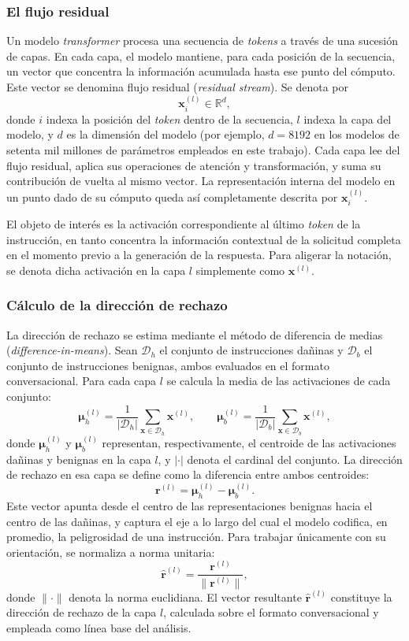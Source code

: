 \documentclass[12pt,a4paper]{article}
\begin{document}
\subsubsection*{El flujo residual}

Un modelo \textit{transformer} procesa una secuencia de \textit{tokens} a través de una sucesión de capas. En cada capa, el modelo mantiene, para cada posición de la secuencia, un vector que concentra la información acumulada hasta ese punto del cómputo. Este vector se denomina flujo residual (\textit{residual stream}). Se denota por
\[
\bm{x}_i^{(l)} \in \mathbb{R}^{d},
\]
donde $i$ indexa la posición del \textit{token} dentro de la secuencia, $l$ indexa la capa del modelo, y $d$ es la dimensión del modelo (por ejemplo, $d = 8192$ en los modelos de setenta mil millones de parámetros empleados en este trabajo). Cada capa lee del flujo residual, aplica sus operaciones de atención y transformación, y suma su contribución de vuelta al mismo vector. La representación interna del modelo en un punto dado de su cómputo queda así completamente descrita por $\bm{x}_i^{(l)}$.

El objeto de interés es la activación correspondiente al último \textit{token} de la instrucción, en tanto concentra la información contextual de la solicitud completa en el momento previo a la generación de la respuesta. Para aligerar la notación, se denota dicha activación en la capa $l$ simplemente como $\bm{x}^{(l)}$.

\subsubsection*{Cálculo de la dirección de rechazo}

La dirección de rechazo se estima mediante el método de diferencia de medias (\textit{difference-in-means}). Sean $\mathcal{D}_{h}$ el conjunto de instrucciones dañinas y $\mathcal{D}_{b}$ el conjunto de instrucciones benignas, ambos evaluados en el formato conversacional. Para cada capa $l$ se calcula la media de las activaciones de cada conjunto:
\[
\bm{\mu}_{h}^{(l)} = \frac{1}{|\mathcal{D}_{h}|} \sum_{\bm{x} \in \mathcal{D}_{h}} \bm{x}^{(l)},
\qquad
\bm{\mu}_{b}^{(l)} = \frac{1}{|\mathcal{D}_{b}|} \sum_{\bm{x} \in \mathcal{D}_{b}} \bm{x}^{(l)},
\]
donde $\bm{\mu}_{h}^{(l)}$ y $\bm{\mu}_{b}^{(l)}$ representan, respectivamente, el centroide de las activaciones dañinas y benignas en la capa $l$, y $|\cdot|$ denota el cardinal del conjunto. La dirección de rechazo en esa capa se define como la diferencia entre ambos centroides:
\[
\bm{r}^{(l)} = \bm{\mu}_{h}^{(l)} - \bm{\mu}_{b}^{(l)}.
\]
Este vector apunta desde el centro de las representaciones benignas hacia el centro de las dañinas, y captura el eje a lo largo del cual el modelo codifica, en promedio, la peligrosidad de una instrucción. Para trabajar únicamente con su orientación, se normaliza a norma unitaria:
\[
\hat{\bm{r}}^{(l)} = \frac{\bm{r}^{(l)}}{\lVert \bm{r}^{(l)} \rVert},
\]
donde $\lVert \cdot \rVert$ denota la norma euclidiana. El vector resultante $\hat{\bm{r}}^{(l)}$ constituye la dirección de rechazo de la capa $l$, calculada sobre el formato conversacional y empleada como línea base del análisis.
\end{document}
